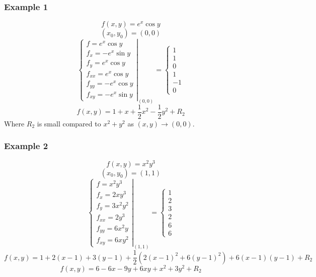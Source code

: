 \documentclass[12pt]{article}
\begin{document}
\subsubsection*{Example 1}
\[f(x,y)=e^x\cos y\]
\[(x_0,y_0)=(0,0)\]
\[\left.\begin{cases}
    f=e^x\cos{y} \\
    f_x=-e^x\sin y \\
    f_y=e^x\cos y \\
    f_{xx} = e^x\cos y \\
    f_{yy}=-e^x\cos{y} \\
    f_{xy}=-e^x\sin y
\end{cases}\right\rvert_{(0,0)}=\begin{cases}
    1 \\
    1 \\
    0 \\
    1 \\
    -1 \\
    0
\end{cases}\]
\[f(x,y)=1+x+\frac{1}{2}x^2-\frac{1}{2}y^2+R_2\]
Where \(R_2\) is small compared to \(x^2+y^2\) as \((x,y)\to(0,0)\).
\subsubsection*{Example 2}
\[f(x,y)=x^2y^3\]
\[(x_0,y_0)=(1,1)\]
\[\left.\begin{cases}
    f=x^2y^3 \\
    f_x=2xy^3 \\
    f_y=3x^2y^2 \\
    f_{xx}=2y^3 \\
    f_{yy} = 6x^2y \\
    f_{xy}=6xy^2
\end{cases}\right\rvert_{(1,1)}=\begin{cases}
    1 \\ 2 \\ 3 \\ 2 \\ 6 \\ 6
\end{cases}\]
\[f(x,y)=1+2(x-1)+3(y-1)+\frac{1}{2}(2(x-1)^2+6(y-1)^2)+6(x-1)(y-1)+R_2\]
\[f(x,y)=6-6x-9y+6xy+x^2+3y^2+R_2\]
\end{document}

